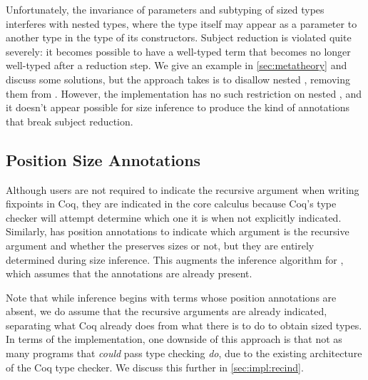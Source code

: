 Unfortunately, the invariance of parameters and subtyping of sized \coinductive types interferes with nested \coinductive types,
where the type itself may appear as a parameter to another type in the type of its constructors.
Subject reduction is violated quite severely: it becomes possible to have a well-typed term that becomes no longer well-typed after a reduction step.
We give an example in \autoref{sec:metatheory} and discuss some solutions,
but the approach \lang takes is to disallow nested \coinductives,
removing them from \CIChatminus.
However, the implementation has no such restriction on nested \coinductives,
and it doesn't appear possible for size inference to produce the kind of annotations that break subject reduction.

\subsection{Position Size Annotations}

Although users are not required to indicate the recursive argument when writing fixpoints in Coq,
they are indicated in the core calculus because Coq's type checker will attempt determine which one it is when not explicitly indicated.
Similarly, \lang has position annotations to indicate which argument is the recursive argument and whether the \cofixpoint preserves sizes or not,
but they are entirely determined during size inference.
This augments the inference algorithm for \CIChat,
which assumes that the annotations are already present.

Note that while inference begins with terms whose position annotations are absent,
we do assume that the recursive arguments are already indicated,
separating what Coq already does from what there is to do to obtain sized types.
In terms of the implementation, one downside of this approach is that not as many programs that \emph{could} pass type checking \emph{do},
due to the existing architecture of the Coq type checker.
We discuss this further in \autoref{sec:impl:recind}.

